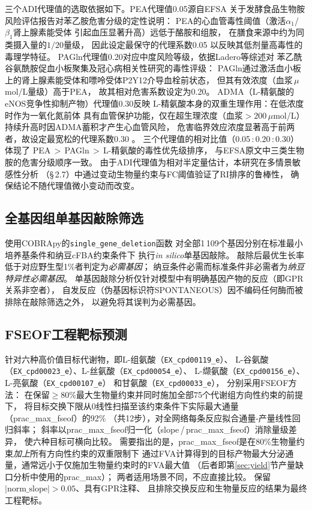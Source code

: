 \documentclass[10pt, a4paper, twocolumn]{ctexart}
\newcommand{\cfba}{cFBA}
\newcommand{\fseof}{FSEOF}
\begin{document}
三个ADI代理值的选取依据如下。PEA代理值0.05源自EFSA
关于发酵食品生物胺风险评估报告对苯乙胺危害分级的定性说明：
PEA的心血管毒性阈值（激活$\alpha_1$/\,$\beta_1$肾上腺素能受体
引起血压显著升高）远低于酪胺和组胺，
在膳食来源中约为同类摄入量的$1/20$量级，
因此设定最保守的代理系数0.05
以反映其低剂量高毒性的毒理学特征\citep{EFSA2011,Ladero2010}。
PAGln代理值0.20对应中度风险等级，依据Ladero等综述对
苯乙酰谷氨酰胺促血小板聚集及冠心病相关性研究的毒性评级：
PAGln通过激活血小板上的肾上腺素能受体和嘌呤受体P2Y12介导血栓前状态，
但其有效浓度（血浆\,$\mu$mol/L量级）高于PEA，
故其相对危害系数设定为0.20\citep{Ladero2010}。
ADMA（L-精氨酸的eNOS竞争性抑制产物）代理值0.30反映
L-精氨酸本身的双重生理作用：在低浓度时作为一氧化氮前体
具有血管保护功能，仅在超生理浓度（血浆$>200$\,$\mu$mol/L）
持续升高时因ADMA蓄积才产生心血管风险，
危害临界效应浓度显著高于前两者，故设定最宽松的代理系数0.30
\citep{EFSA2011}。
三个代理值的相对比值（0.05\,:\,0.20\,:\,0.30）体现了
PEA\,$>$\,PAGln\,$>$\,L-精氨酸的毒性优先级排序，
与EFSA原文中三类生物胺的危害分级顺序一致。
由于ADI代理值为相对半定量估计，本研究在多情景敏感性分析
（\S\,2.7）中通过变动生物量约束与FC阈值验证了RI排序的鲁棒性，
确保结论不随代理值微小变动而改变。

\subsection{全基因组单基因敲除筛选}

使用COBRApy的\texttt{single\_gene\_deletion}函数
对全部1\,109个基因分别在标准最小培养基条件和纳豆\cfba{}约束条件下
执行\textit{in silico}单基因敲除。
敲除后最优生长率低于对应野生型1\%者判定为\emph{必需基因}；
纳豆条件必需而标准条件非必需者为\emph{纳豆特异性必需基因}。
单基因敲除分析仅针对模型中有明确基因产物的反应（即GPR关系非空者），
自发反应（伪基因标识符SPONTANEOUS）因不编码任何酶而被排除在敲除筛选之外，
以避免将其误判为必需基因。

\subsection{FSEOF工程靶标预测}

针对六种高价值目标代谢物，即L-组氨酸（\texttt{EX\_cpd00119\_e}）、
L-谷氨酸（\texttt{EX\_cpd00023\_e}）、L-丝氨酸（\texttt{EX\_cpd00054\_e}）、
L-缬氨酸（\texttt{EX\_cpd00156\_e}）、L-亮氨酸（\texttt{EX\_cpd00107\_e}）
和甘氨酸（\texttt{EX\_cpd00033\_e}），
分别采用\fseof{}方法\citep{Patil2005}：
在保留$\geq$80\%最大生物量约束并同时施加全部75个代谢组方向性约束的前提下，
将目标交换下限从0线性扫描至该约束条件下实际最大通量（prac\_max\_fseof）的92\%
（共12步），对全网络每条反应拟合通量-产量线性回归斜率；
斜率以prac\_max\_fseof归一化（slope\,/\,prac\_max\_fseof）消除量级差异，
使六种目标可横向比较。
需要指出的是，prac\_max\_fseof是在80\%生物量约束\emph{加上}所有方向性约束的双重限制下
通过FVA计算得到的目标产物最大分泌通量，通常远小于仅施加生物量约束时的FVA最大值
（后者即第\ref{sec:yield}节产量缺口分析中使用的prac\_max）；
两者适用场景不同，不应直接比较。
保留$|\text{norm\_slope}|>0.05$、具有GPR注释、
且排除交换反应和生物量反应的结果为最终工程靶标。
\end{document}
